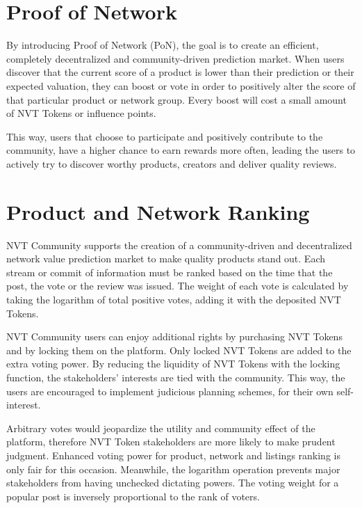 
\section{Proof of Network}

By introducing Proof of Network (PoN), the goal is to create an efficient, completely decentralized and community-driven prediction market. When users discover that the current score of a product is lower than their prediction or their expected valuation, they can boost or vote in order to positively alter the score of that particular product or network group. Every boost will cost a small amount of NVT Tokens or influence points.

This way, users that choose to participate and positively contribute to the community, have a higher chance to earn rewards more often, leading the users to actively try to discover worthy products, creators and deliver quality reviews.

\section{Product and Network Ranking}

NVT Community supports the creation of a community-driven and decentralized network value prediction market to make quality products stand out. Each stream or commit of information must be ranked based on the time that the post, the vote or the review was issued. The weight of each vote is calculated by taking the logarithm of total positive votes, adding it with the deposited NVT Tokens.

NVT Community users can enjoy additional rights by purchasing NVT Tokens and by locking them on the platform. Only locked NVT Tokens are added to the extra voting power. By reducing the liquidity of NVT Tokens with the locking function, the stakeholders’ interests are tied with the community. This way, the users are encouraged to implement judicious planning schemes, for their own self-interest.

Arbitrary votes would jeopardize the utility and community effect of the platform, therefore NVT Token stakeholders are more likely to make prudent judgment. Enhanced voting power for product, network and listings ranking is only fair for this occasion. Meanwhile, the logarithm operation prevents major stakeholders from having unchecked dictating powers. The voting weight for a popular post is inversely proportional to the rank of voters.

